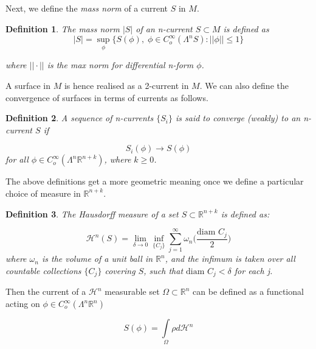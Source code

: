 \documentclass{amsart}
\newcommand{\hm}{\mathscr{H}}
\newtheorem{definition}{Definition}
\theoremstyle{named}
\begin{document}
Next, we define the \textit{mass norm} of a current $S$ in $M$.

\begin{definition}
    The mass norm $|S|$ of an n-current $S \subset M$ is defined as 
    \begin{equation*}
    |S| = \sup\limits_{\phi} \{ S(\phi), \; \phi \in C_{o}^{\infty}(\Lambda^n S): ||\phi|| \leq 1 \}
    \end{equation*}

    where $|| \cdot ||$ is the max norm for differential n-form $\phi$.

\end{definition}

A surface in $M$ is hence realised as a 2-current in $M$. We can also define the convergence of surfaces in terms of currents as follows. 

\begin{definition} 
    A sequence of n-currents $\{S_i\}$ is said to converge (weakly) to an n-current $S$ if 

    \begin{equation*}
        S_i (\phi) \rightarrow S(\phi)
    \end{equation*}
    for all $\phi \in C_{o}^{\infty}(\Lambda^n \mathbb{R}^{n+k})$, where $k \geq 0$.
\end{definition}

The above definitions get a more geometric meaning once we define a particular choice of measure in $\mathbb{R}^{n+k}$.

\begin{definition}
    The Hausdorff measure of a set $S \subset \mathbb{R}^{n+k}$ is defined as:

    \begin{equation*}
        \hm^{n}(S) = \lim\limits_{\delta \rightarrow 0} \inf\limits_{\{C_j\}} \sum\limits_{j=1}^{\infty} \omega_n \Big( \frac{\text{diam }C_j}{2} \Big) 
    \end{equation*}
    where $\omega_n$ is the volume of a unit ball in $\mathbb{R}^n$, and the infimum is taken over all countable collections $\{C_j\}$ covering $S$, such that $\text{diam }C_j < \delta$ for each j.
\end{definition}

Then the current of a $\hm^n$ measurable set $\Omega \subset \mathbb{R}^{n}$ can be defined as a functional acting on $\phi \in C_{o}^{\infty}(\Lambda^n \mathbb{R}^{n})$ 

\begin{equation*}
    S(\phi) = \int\limits_{\Omega} \rho d\hm^n
\end{equation*}
\end{document}
